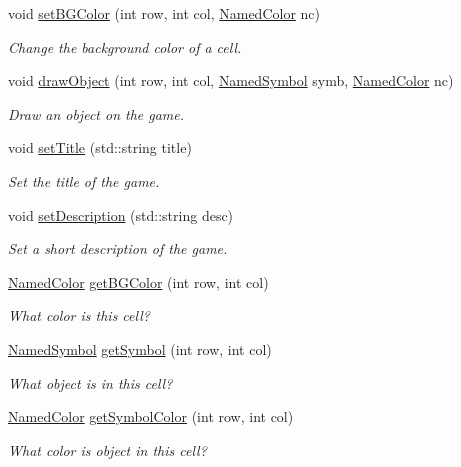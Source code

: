 \begin{DoxyCompactItemize}
void \hyperlink{classbridges_1_1_game_base_a5d26e92863c37054acfd216878d741a5}{set\+B\+G\+Color} (int row, int col, \hyperlink{namespacebridges_ad811207d8898a7fd6b72a74725e68357}{Named\+Color} nc)
\begin{DoxyCompactList}\small\item\em Change the background color of a cell. \end{DoxyCompactList}\item 
void \hyperlink{classbridges_1_1_game_base_aca81c3d696ee509f2f95546fcd328202}{draw\+Object} (int row, int col, \hyperlink{namespacebridges_acfb0a4f7877d8f63de3e6862004c50ed}{Named\+Symbol} symb, \hyperlink{namespacebridges_ad811207d8898a7fd6b72a74725e68357}{Named\+Color} nc)
\begin{DoxyCompactList}\small\item\em Draw an object on the game. \end{DoxyCompactList}\item 
void \hyperlink{classbridges_1_1_game_base_aece7bcc2abff75e54f66d6b3864da76c}{set\+Title} (std\+::string title)
\begin{DoxyCompactList}\small\item\em Set the title of the game. \end{DoxyCompactList}\item 
void \hyperlink{classbridges_1_1_game_base_a56dbb3a095631643f7a9047df230605f}{set\+Description} (std\+::string desc)
\begin{DoxyCompactList}\small\item\em Set a short description of the game. \end{DoxyCompactList}\item 
\hyperlink{namespacebridges_ad811207d8898a7fd6b72a74725e68357}{Named\+Color} \hyperlink{classbridges_1_1_game_base_ab56452f544bd4090886b911f12bac3b6}{get\+B\+G\+Color} (int row, int col)
\begin{DoxyCompactList}\small\item\em What color is this cell? \end{DoxyCompactList}\item 
\hyperlink{namespacebridges_acfb0a4f7877d8f63de3e6862004c50ed}{Named\+Symbol} \hyperlink{classbridges_1_1_game_base_a95527dc7b0294883f27a380c3a27e78e}{get\+Symbol} (int row, int col)
\begin{DoxyCompactList}\small\item\em What object is in this cell? \end{DoxyCompactList}\item 
\hyperlink{namespacebridges_ad811207d8898a7fd6b72a74725e68357}{Named\+Color} \hyperlink{classbridges_1_1_game_base_a365f55e4004bd9b01b0dd1431bea9876}{get\+Symbol\+Color} (int row, int col)
\begin{DoxyCompactList}\small\item\em What color is object in this cell? \end{DoxyCompactList}\end{DoxyCompactItemize}
